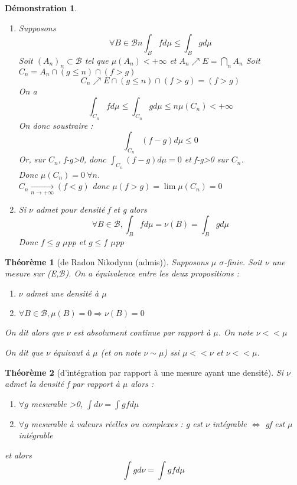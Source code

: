 \documentclass{article}
\theoremstyle{mes_theoremes}
\newtheorem{theo}{Théorème}[section]
\newtheorem*{dem}{Démonstration}
\begin{document}
\begin{dem}
\begin{enumerate}
\item Supposons \[\forall B \in \mathcal{B}n \int_B fd\mu \leq \int_B gd\mu\]
Soit $(A_n)_n \subset\mathcal{B}$ tel que $\mu(A_n)<+\infty$ et $A_n \nearrow E=\bigcap_n A_n$
Soit $C_n=A_n\cap(g\leq n)\cap(f>g)$ \\
\[C_n \nearrow E\cap(g\leq n)\cap(f>g)=(f>g)\]
On a \[\int_{C_n} fd\mu \leq \int_{C_n} gd\mu \leq n\mu(C_n) <+\infty\]
On donc soustraire : \[\int_{C_n} (f-g)d\mu\leq 0\]
Or, sur $C_n$, f-g>0, donc $\int_{C_n} (f-g)d\mu= 0$ et f-g>0 sur $C_n$. \\
Donc $\mu(C_n)=0\ \forall n$. \\
$C_n \xrightarrow[n \to +\infty]{} (f<g)$ donc $\mu(f>g)=\lim \mu(C_n)=0$

\item Si $\nu$ admet pour densité f et g alors \[\forall B \in \mathcal{B}, \int_B fd\mu = \nu(B) = \int_B gd\mu\]
Donc $f\leq g$ $\mu$pp et $g\leq f$ $\mu$pp
\end{enumerate}
\end{dem}

\begin{theo}[de Radon Nikodynn (admis)]
Supposons $\mu$ $\sigma$-finie. Soit $\nu$ une mesure sur (E,$\mathcal{B}$). On a équivalence entre les deux propositions :
\begin{enumerate}
\item $\nu$ admet une densité à $\mu$
\item $\forall B\in \mathcal{B}, \mu(B)=0\Rightarrow \nu(B)=0$
\end{enumerate}
On dit alors que $\nu$ est absolument continue par rapport à $\mu$. On note $\nu<<\mu$

On dit que $\nu$ équivaut à $\mu$ (et on note $\nu \sim \mu$) ssi $\mu<<\nu$ et $\nu<<\mu$.
\end{theo}

\begin{theo}[d'intégration par rapport à une mesure ayant une densité]
Si $\nu$ admet la densité f par rapport à $\mu$ alors :
\begin{enumerate}
\item $\forall g$ mesurable >0, $\int d\nu = \int gfd\mu$
\item $\forall g$ mesurable à valeurs réelles ou complexes : g est $\nu$ intégrable $\Leftrightarrow$ gf est $\mu$ intégrable
\end{enumerate}
et alors \[\int gd\nu = \int gf d\mu\]
\end{theo}
\end{document}
